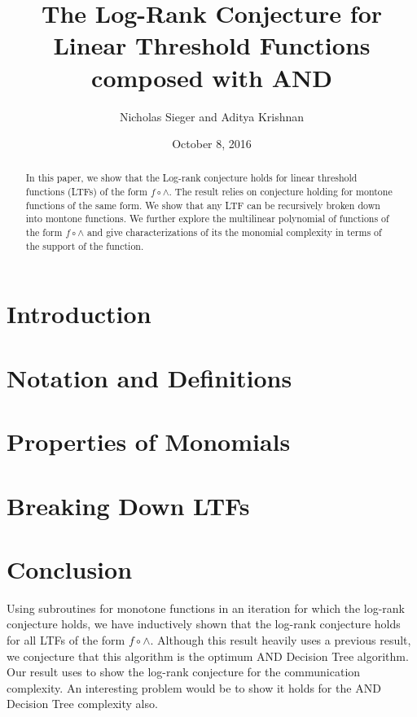 \documentclass[a4paper]{article}
\title{The Log-Rank Conjecture for Linear Threshold Functions composed with AND}
\author{Nicholas Sieger and Aditya Krishnan}
\date{October 8, 2016}
\begin{document}
	\maketitle
	\begin{abstract}
		In this paper, we show that the Log-rank conjecture holds for linear threshold functions (LTFs) of the form $f \circ \wedge$. The result relies on conjecture holding for montone functions of the same form. We show that any LTF can be recursively broken down into montone functions. We further explore the multilinear polynomial of functions of the form $f \circ \wedge$ and give characterizations of its the monomial complexity in terms of the support of the function. 
	\end{abstract}
	\section{Introduction}
	\section{Notation and Definitions}
	
	\section{Properties of Monomials}
	
	\section{Breaking Down LTFs}
	
	\section{Conclusion}
	Using subroutines for monotone functions in an iteration for which the log-rank conjecture holds, we have inductively shown that the log-rank conjecture holds for all LTFs of the form $f \circ \wedge$. Although this result heavily uses a previous result, we conjecture that this algorithm is the optimum  AND Decision Tree algorithm. Our result uses \cite{Buhrman1999} to show the log-rank conjecture for the communication complexity. An interesting problem would be to show it holds for the AND Decision Tree complexity also. 
	
	
\end{document}
